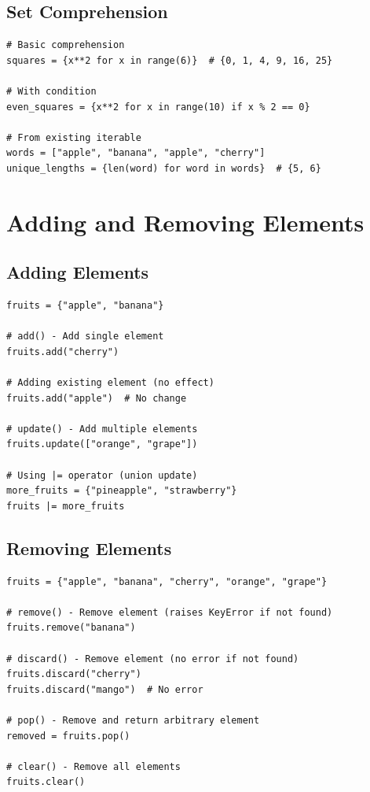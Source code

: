 \documentclass[12pt,a4paper]{article}
\begin{document}
\subsection{Set Comprehension}

\begin{lstlisting}
# Basic comprehension
squares = {x**2 for x in range(6)}  # {0, 1, 4, 9, 16, 25}

# With condition
even_squares = {x**2 for x in range(10) if x % 2 == 0}

# From existing iterable
words = ["apple", "banana", "apple", "cherry"]
unique_lengths = {len(word) for word in words}  # {5, 6}
\end{lstlisting}

\section{Adding and Removing Elements}

\subsection{Adding Elements}

\begin{lstlisting}
fruits = {"apple", "banana"}

# add() - Add single element
fruits.add("cherry")

# Adding existing element (no effect)
fruits.add("apple")  # No change

# update() - Add multiple elements
fruits.update(["orange", "grape"])

# Using |= operator (union update)
more_fruits = {"pineapple", "strawberry"}
fruits |= more_fruits
\end{lstlisting}

\subsection{Removing Elements}

\begin{lstlisting}
fruits = {"apple", "banana", "cherry", "orange", "grape"}

# remove() - Remove element (raises KeyError if not found)
fruits.remove("banana")

# discard() - Remove element (no error if not found)
fruits.discard("cherry")
fruits.discard("mango")  # No error

# pop() - Remove and return arbitrary element
removed = fruits.pop()

# clear() - Remove all elements
fruits.clear()
\end{lstlisting}
\end{document}
